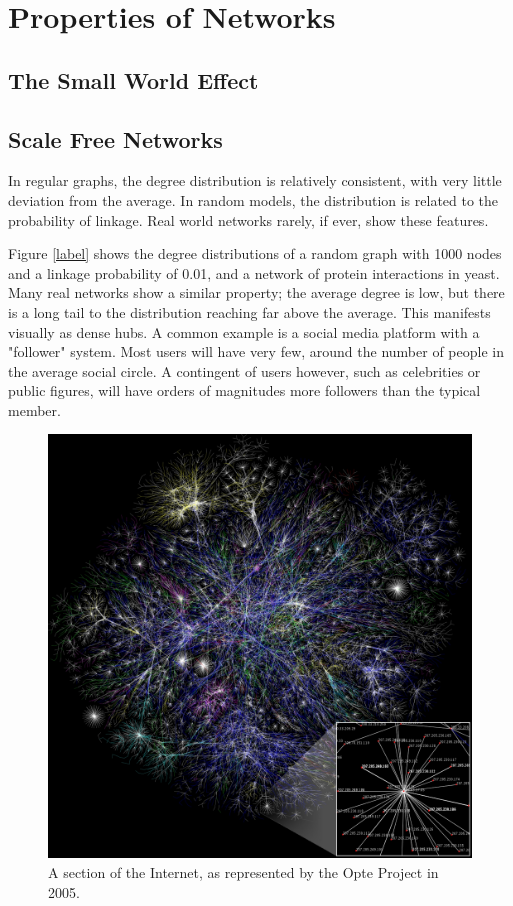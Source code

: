 \section{Properties of Networks}


\subsection{The Small World Effect}


\subsection{Scale Free Networks}

In regular graphs, the degree distribution is relatively consistent, with very little deviation from the average. In random models, the distribution is related to the probability of linkage. Real world networks rarely, if ever, show these features.

Figure \ref{label} shows the degree distributions of a random graph with 1000 nodes and a linkage probability of 0.01, and a network of protein interactions in yeast. Many real networks show a similar property; the average degree is low, but there is a long tail to the distribution reaching far above the average. This manifests visually as dense hubs. A common example is a social media platform with a "follower" system. Most users will have very few, around the number of people in the average social circle. A contingent of users however, such as celebrities or public figures, will have orders of magnitudes more followers than the typical member.

\begin{figure}[!h]
	\begin{center}
		\includegraphics[scale=0.2]{images/Internet_map_1024.jpg}
	\end{center}
	\caption{A section of the Internet, as represented by the Opte Project in 2005.}
	\label{logo}
\end{figure}


